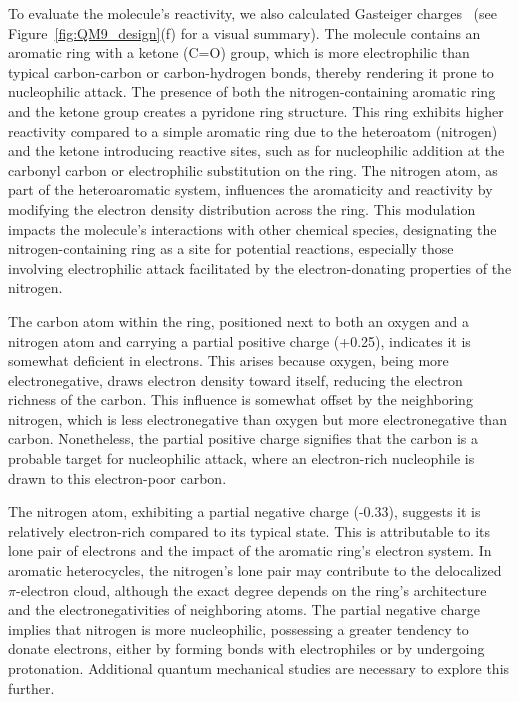To evaluate the molecule's reactivity, we also calculated Gasteiger charges~\cite{Gasteiger1980IterativeCharges} (see Figure~\ref{fig:QM9_design}(f) for a visual summary). The molecule contains an aromatic ring with a ketone (C=O) group, which is more electrophilic than typical carbon-carbon or carbon-hydrogen bonds, thereby rendering it prone to nucleophilic attack. The presence of both the nitrogen-containing aromatic ring and the ketone group creates a pyridone ring structure. This ring exhibits higher reactivity compared to a simple aromatic ring due to the heteroatom (nitrogen) and the ketone introducing reactive sites, such as for nucleophilic addition at the carbonyl carbon or electrophilic substitution on the ring. The nitrogen atom, as part of the heteroaromatic system, influences the aromaticity and reactivity by modifying the electron density distribution across the ring. This modulation impacts the molecule’s interactions with other chemical species, designating the nitrogen-containing ring as a site for potential reactions, especially those involving electrophilic attack facilitated by the electron-donating properties of the nitrogen.

The carbon atom within the ring, positioned next to both an oxygen and a nitrogen atom and carrying a partial positive charge (+0.25), indicates it is somewhat deficient in electrons. This arises because oxygen, being more electronegative, draws electron density toward itself, reducing the electron richness of the carbon. This influence is somewhat offset by the neighboring nitrogen, which is less electronegative than oxygen but more electronegative than carbon. Nonetheless, the partial positive charge signifies that the carbon is a probable target for nucleophilic attack, where an electron-rich nucleophile is drawn to this electron-poor carbon.

The nitrogen atom, exhibiting a partial negative charge (-0.33), suggests it is relatively electron-rich compared to its typical state. This is attributable to its lone pair of electrons and the impact of the aromatic ring’s electron system. In aromatic heterocycles, the nitrogen’s lone pair may contribute to the delocalized $\pi$-electron cloud, although the exact degree depends on the ring’s architecture and the electronegativities of neighboring atoms. The partial negative charge implies that nitrogen is more nucleophilic, possessing a greater tendency to donate electrons, either by forming bonds with electrophiles or by undergoing protonation. Additional quantum mechanical studies are necessary to explore this further.

